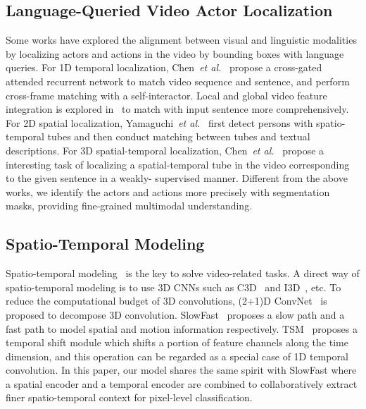 \documentclass[final]{cvpr}
\begin{document}
\subsection{Language-Queried Video Actor Localization}
Some works have explored the alignment between visual and linguistic modalities by localizing actors and actions in the video by bounding boxes with language queries. 
For 1D temporal localization, Chen~\textit{et al.}~\cite{chen2019localizing} propose a cross-gated attended recurrent network to match video sequence and sentence, and perform cross-frame matching with a self-interactor. 
Local and global video feature integration is explored in~\cite{anne2017localizing} to match with input sentence more comprehensively. 
For 2D spatial localization, Yamaguchi~\textit{et al.}~\cite{yamaguchi2017spatio} first detect persons with spatio-temporal tubes and then conduct matching between tubes and textual descriptions. 
For 3D spatial-temporal localization, Chen~\textit{et al.}~\cite{chen2019weakly} propose a interesting task of localizing a spatial-temporal tube in the video corresponding to the given sentence in a weakly- supervised manner. 
Different from the above works, we identify the actors and actions more precisely with segmentation masks, providing fine-grained multimodal understanding.

\subsection{Spatio-Temporal Modeling}
Spatio-temporal modeling~\cite{simonyan2014two, feichtenhofer2016convolutional, wang2016temporal} is the key to solve video-related tasks. 
A direct way of spatio-temporal modeling is to use 3D CNNs such as C3D~\cite{tran2015learning} and I3D~\cite{carreira2017quo}, etc.
To reduce the computational budget of 3D convolutions, (2+1)D ConvNet~\cite{tran2018closer, qiu2017learning} is proposed to decompose 3D convolution. 
SlowFast~\cite{feichtenhofer2019slowfast} proposes a slow path and a fast path to model spatial and motion information respectively. 
TSM~\cite{lin2019tsm} proposes a temporal shift module which shifts a portion of feature channels along the time dimension, and this operation can be regarded as a special case of 1D temporal convolution. 
In this paper, our model shares the same spirit with SlowFast where a spatial encoder and a temporal encoder are combined to collaboratively extract finer spatio-temporal context for pixel-level classification.
\end{document}
